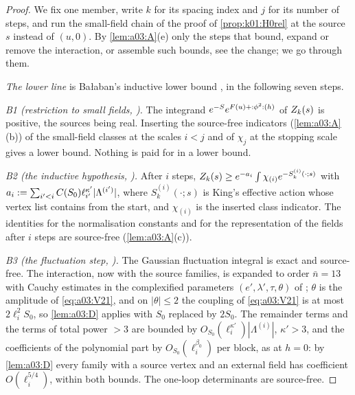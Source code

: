 \begin{proof}
We fix one member, write $k$ for its spacing index and $j$ for its number of steps, and run the small-field chain of the proof of \cref{prop:k01:H0rel} at the source $s$ instead of $(u,0)$. By \cref{lem:a03:A}(e) only the steps that bound, expand or remove the interaction, or assemble such bounds, see the change; we go through them.

\emph{The lower line} is Ba{\l}aban's inductive lower bound \cite[Sect.~3]{Ba1}, in the following seven steps.

\textit{B1 (restriction to small fields, \cite[(3.6)]{Ba1}).} The integrand $e^{-S}e^{F(u)+{:}\phi^2{:}(h)}$ of $Z_{k}(s)$ is positive, the sources being real. Inserting the source-free indicators (\cref{lem:a03:A}(b)) of the small-field classes at the scales $i<j$ and of $\chi_j$ at the stopping scale gives a lower bound. Nothing is paid for in a lower bound.

\textit{B2 (the inductive hypothesis, \cite[(3.26)--(3.32)]{Ba1}).} After $i$ steps, $Z_{k}(s)\ge e^{-a_i}\int\chi_{(i)}e^{-S^{(i)}_k(\cdot;s)}$ with $a_i:=\sum_{i'<i}C(S_0)\ell_{i'}^{\kappa'}|\Lambda^{(i')}|$, where $S^{(i)}_k(\cdot;s)$ is King's effective action whose vertex list contains \cite[(3.20)--(3.21)]{K1} from the start, and $\chi_{(i)}$ is the inserted class indicator. The identities for the normalisation constants and for the representation of the fields after $i$ steps are source-free (\cref{lem:a03:A}(c)).

\textit{B3 (the fluctuation step, \cite[(3.37)--(3.49), Props.~3.1--3.2]{Ba1}).} The Gaussian fluctuation integral is exact and source-free. The interaction, now with the source families, is expanded to order $\bar n=13$ with Cauchy estimates in the complexified parameters $(e',\lambda',\tau,\theta)$ of \cite[(3.17)]{K1}; $\theta$ is the amplitude of \eqref{eq:a03:V21}, and on $|\theta|\le2$ the coupling of \eqref{eq:a03:V21} is at most $2\ell_i^2S_0$, so \cref{lem:a03:D} applies with $S_0$ replaced by $2S_0$. The remainder terms and the terms of total power $>3$ are bounded by $O_{S_0}(\ell_i^{\kappa'})|\Lambda^{(i)}|$, $\kappa'>3$, and the coefficients of the polynomial part by $O_{S_0}(\ell_i^{\beta_0})$ per block, as at $h=0$: by \cref{lem:a03:D} every family with a source vertex and an external field has coefficient $O(\ell_i^{5/4})$, within both bounds. The one-loop determinants are source-free.


\end{proof}
